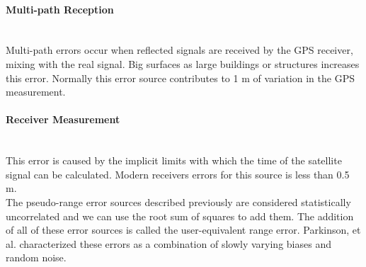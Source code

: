 \paragraph{Multi-path Reception} \hspace{0pt} \\
Multi-path errors occur when reflected signals are received by the GPS receiver, mixing with the real signal. Big surfaces as large buildings or structures increases this error. Normally this error source contributes to 1 m of variation in the GPS measurement.


\paragraph{Receiver Measurement} \hspace{0pt} \\
This error is caused by the implicit limits with which the time of the satellite signal can be calculated. Modern receivers errors for this source is less than 0.5 m. \\

The pseudo-range error sources described previously are considered statistically uncorrelated and we can use the root sum of squares to add them. The addition of all of these error sources is called the user-equivalent range error. Parkinson, et al. \cite{Parkinson1996} characterized these errors as a combination of slowly varying biases and random noise.

